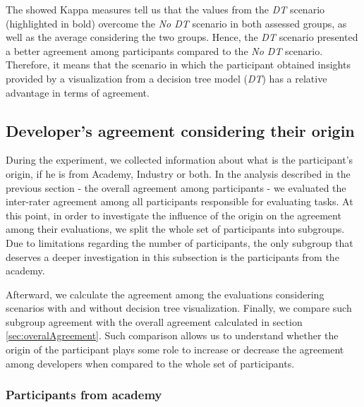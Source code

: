 The showed Kappa measures tell us that the values from the \textit{DT} scenario (highlighted in bold) overcome the \textit{No DT} scenario in both assessed groups, as well as the average considering the two groups. Hence, the \textit{DT} scenario presented a better agreement among participants compared to the \textit{No DT} scenario. Therefore, it means that the scenario in which the participant obtained insights provided by a visualization from a decision tree model (\textit{DT}) has a relative advantage in terms of agreement. %

\subsection{Developer's agreement considering their origin} \label{sec:originAgreement}

During the experiment, we collected information about what is the participant's origin,
if he is from Academy, Industry or both. In the analysis described in the previous section - the overall agreement among participants - we evaluated the inter-rater agreement among all participants responsible for evaluating tasks. At this point, in order to investigate the influence of the origin on the agreement among their evaluations, we split the whole set of participants into subgroups. Due to limitations regarding the number of participants, the only subgroup that deserves a deeper investigation in this subsection is the participants from the academy.

Afterward, we calculate the agreement among the evaluations considering scenarios with and without decision tree visualization. Finally, we compare such subgroup agreement with the overall agreement calculated in section \ref{sec:overalAgreement}. Such comparison allows us to understand whether the origin of the participant plays some role to increase or decrease the agreement among developers when compared to the whole set of participants. 

\subsubsection{Participants from academy} \label{sec:participantsAcademyAgreement}


